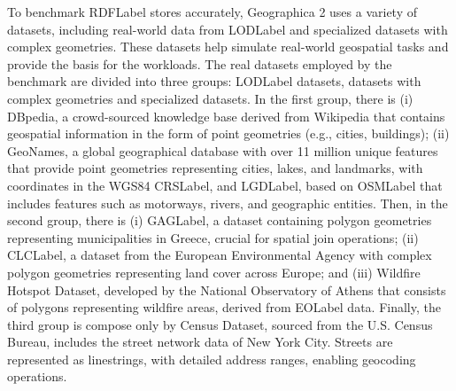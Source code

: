 To benchmark \acrshort{RDFLabel} stores accurately, Geographica 2 uses a variety of datasets, including real-world data from \acrfull{LODLabel} and specialized datasets with complex geometries. These datasets help simulate real-world geospatial tasks and provide the basis for the workloads. The real datasets employed by the benchmark are divided into three groups: \acrshort{LODLabel} datasets, datasets with complex geometries and specialized datasets. In the first group, there is (i) DBpedia\cite{DBpedia2024}, a crowd-sourced knowledge base derived from Wikipedia that contains geospatial information in the form of point geometries (e.g., cities, buildings); (ii) GeoNames\cite{GeoNames}, a global geographical database with over 11 million unique features that provide point geometries representing cities, lakes, and landmarks, with coordinates in the WGS84 \acrshort{CRSLabel}, and \acrfull{LGDLabel}\cite{LinkedGeoData}, based on \acrfull{OSMLabel}\cite{OpenStreetMap} that includes features such as motorways, rivers, and geographic entities. Then, in the second group, there is (i) \acrfull{GAGLabel}\cite{GreekAdministrativeGeography}, a dataset containing polygon geometries representing municipalities in Greece, crucial for spatial join operations; (ii) \acrfull{CLCLabel}\cite{CORINELandCover}, a dataset from the European Environmental Agency with complex polygon geometries representing land cover across Europe; and (iii) Wildfire Hotspot Dataset\cite{sifakisWildfireDetectionTracking2011}, developed by the National Observatory of Athens that consists of polygons representing wildfire areas, derived from \acrfull{EOLabel} data. Finally, the third group is compose only by Census Dataset, sourced from the U.S. Census Bureau, includes the street network data of New York City. Streets are represented as linestrings, with detailed address ranges, enabling geocoding operations.

